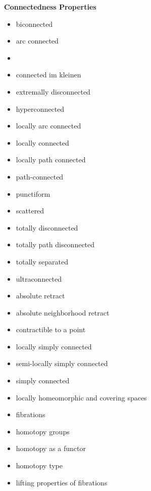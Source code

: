 \documentclass[12pt]{article}
\begin{document}
\centerline {\bf Connectedness Properties}
\begin{itemize}
\item biconnected
\item arc connected
\item {}
\item connected im kleinen
\item extremally disconnected
\item hyperconnected
\item locally arc connected
\item locally connected
\item locally path connected
\item path-connected
\item punctiform
\item scattered
\item totally disconnected
\item totally path disconnected
\item totally separated
\item ultraconnected
\end{itemize}

\centerline {}
\begin{itemize}
\item absolute retract
\item absolute neighborhood retract
\item contractible to a point
\end{itemize}

\centerline{}
\begin{itemize}
\item locally simply connected
\item semi-locally simply connected
\item simply connected
\item locally homeomorphic and covering spaces
\item fibrations
\item homotopy groups
\item homotopy as a functor
\item homotopy type
\item lifting properties of fibrations
\end{itemize}
\end{document}
